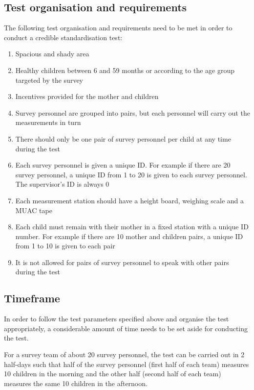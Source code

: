 \documentclass[12pt,a4paper]{book}
\theoremstyle{definition}
\theoremstyle{definition}
\theoremstyle{definition}
\theoremstyle{remark}
\begin{document}
\hypertarget{test-organisation-and-requirements}{%
\subsection{Test organisation and
requirements}\label{test-organisation-and-requirements}}

The following test organisation and requirements need to be met in order
to conduct a credible standardisation test:

\begin{enumerate}
\def\labelenumi{\arabic{enumi}.}
\item
  Spacious and shady area
\item
  Healthy children between 6 and 59 months or according to the age group
  targeted by the survey
\item
  Incentives provided for the mother and children
\item
  Survey personnel are grouped into pairs, but each personnel will carry
  out the measurements in turn
\item
  There should only be one pair of survey personnel per child at any
  time during the test
\item
  Each survey personnel is given a unique ID. For example if there are
  20 survey personnel, a unique ID from 1 to 20 is given to each survey
  personnel. The supervisor's ID is always 0
\item
  Each measurement station should have a height board, weighing scale
  and a MUAC tape
\item
  Each child must remain with their mother in a fixed station with a
  unique ID number. For example if there are 10 mother and children
  pairs, a unique ID from 1 to 10 is given to each pair
\item
  It is not allowed for pairs of survey personnel to speak with other
  pairs during the test
\end{enumerate}

\hypertarget{timeframe}{%
\subsection{Timeframe}\label{timeframe}}

In order to follow the test parameters specified above and organise the
test appropriately, a considerable amount of time needs to be set aside
for conducting the test.

For a survey team of about 20 survey personnel, the test can be carried
out in 2 half-days such that half of the survey personnel (first half of
each team) measures 10 children in the morning and the other half
(second half of each team) measures the same 10 children in the
afternoon.
\end{document}
